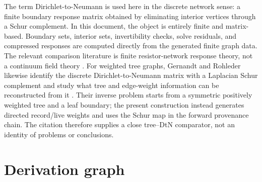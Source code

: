 \documentclass[11pt]{article}
\theoremstyle{remark}
\numberwithin{equation}{section}
\begin{document}
The term Dirichlet-to-Neumann is used here in the discrete network sense: a finite boundary response matrix obtained by eliminating interior vertices through a Schur complement. In this document, the object is entirely finite and matrix-based. Boundary sets, interior sets, invertibility checks, solve residuals, and compressed responses are computed directly from the generated finite graph data. The relevant comparison literature is finite resistor-network response theory, not a continuum field theory \cite{CurtisMorrow1991,CurtisIngermanMorrow1998}. For weighted tree graphs, Gernandt and Rohleder likewise identify the discrete Dirichlet-to-Neumann matrix with a Laplacian Schur complement and study what tree and edge-weight information can be reconstructed from it \cite{GernandtRohleder2022}. Their inverse problem starts from a symmetric positively weighted tree and a leaf boundary; the present construction instead generates directed record/live weights and uses the Schur map in the forward provenance chain. The citation therefore supplies a close tree--DtN comparator, not an identity of problems or conclusions.

\section{Derivation graph}
\end{document}
